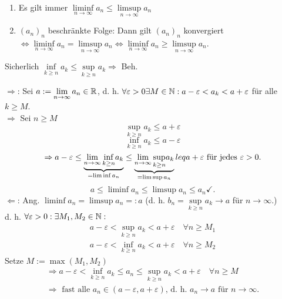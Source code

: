 \documentclass[../ana1.tex]{subfiles}
\begin{document}
\begin{lem}
	\begin{enumerate}
		\item Es gilt immer \( \liminf\limits_{n\rightarrow\infty}a_n \leq \limsup\limits_{n\rightarrow\infty}a_n \)
		\item \((a_n)_n\) beschränkte Folge: Dann gilt \((a_n)_n\) konvergiert \( \Leftrightarrow \liminf\limits_{n\rightarrow\infty}a_n = \limsup\limits_{n\rightarrow\infty}a_n \Leftrightarrow \liminf\limits_{n\rightarrow\infty}a_n \geq \limsup\limits_{n\rightarrow\infty}a_n \).
	\end{enumerate}
\end{lem}
\begin{bew}
	\item Sicherlich \( \underset{k\geq n}{\inf}a_k \leq \underset{k\geq n}{\sup} a_k \Rightarrow \) Beh. \checkmark
	\item \glqq\(\Rightarrow \)\grqq: Sei \(a:= \lim\limits_{n\rightarrow\infty}a_n\in\mathbb{R}\), d. h. \( \forall \varepsilon > 0 \exists M\in\mathbb{N}: a-\varepsilon < a_k < a+ \varepsilon \) für alle \(k \geq M \).\\
	\( \Rightarrow \) Sei \(n\geq M\) 
	\[ \underset{k\geq n}{\sup} a_k \leq a+\varepsilon \]
	\[ \underset{k\geq n}{\inf} a_k \leq a-\varepsilon \]
	\[ \Rightarrow a-\varepsilon \leq \underbrace{\lim\limits_{n\rightarrow\infty}\underset{k\geq n}{\inf}a_k}_{=\liminf a_n} \leq \underbrace{\lim\limits_{n\rightarrow\infty}\underset{k\geq n}{\sup}a_k}_{=\limsup a_n}leq a+\varepsilon \text{ für jedes } \varepsilon>0. \]
	\[ a\leq \liminf a_n \leq \limsup a_n \leq a_n \checkmark. \]
	\glqq\(\Leftarrow\)\grqq: Ang. \( \liminf a_n = \limsup a_n =: a \) (d. h. \(b_n =  \underset{k\geq n}{\sup} a_k \rightarrow a \) für \( n\rightarrow\infty \).)\\
	d. h. \( \forall \varepsilon>0: \exists M_1,M_2 \in\mathbb{N}: \)
	\begin{align*}
		a-\varepsilon < \underset{k\geq n}{\sup} a_k < a + \varepsilon \quad \forall n\geq M_1\\
		a-\varepsilon < \underset{k\geq n}{\inf} a_k < a + \varepsilon \quad \forall n\geq M_2
	\end{align*}
	Setze \(M := \max(M_1, M_2) \)\\
	\begin{align*}
		\Rightarrow a-\varepsilon < \underset{k\geq n}{\inf} a_k \leq a_n \leq \underset{k\geq n}{\sup} a_k < a + \varepsilon \quad \forall n\geq M\\
		\Rightarrow \text{ fast alle } a_n\in(a-\varepsilon,a+\varepsilon)\text{, d. h. }a_n\rightarrow a \text{ für } n\rightarrow \infty.
	\end{align*}
\end{bew}
\end{document}
